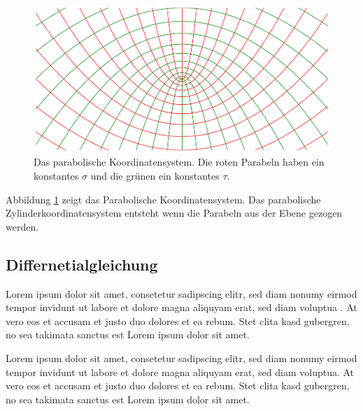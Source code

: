 \begin{figure}
    \centering
    \includegraphics[scale=0.4]{papers/parzyl/img/koordinaten.png}
    \caption{Das parabolische Koordinatensystem. Die roten Parabeln haben ein 
    konstantes $\sigma$ und die grünen ein konstantes $\tau$.}
    \label{fig:cordinates}
\end{figure}

Abbildung \ref{fig:cordinates} zeigt das Parabolische Koordinatensystem.
Das parabolische Zylinderkoordinatensystem entsteht wenn die Parabeln aus der
Ebene gezogen werden. 

\subsection{Differnetialgleichung}
Lorem ipsum dolor sit amet, consetetur sadipscing elitr, sed diam
nonumy eirmod tempor invidunt ut labore et dolore magna aliquyam
erat, sed diam voluptua \cite{parzyl:bibtex}.
At vero eos et accusam et justo duo dolores et ea rebum.
Stet clita kasd gubergren, no sea takimata sanctus est Lorem ipsum
dolor sit amet.

Lorem ipsum dolor sit amet, consetetur sadipscing elitr, sed diam
nonumy eirmod tempor invidunt ut labore et dolore magna aliquyam
erat, sed diam voluptua.
At vero eos et accusam et justo duo dolores et ea rebum.  Stet clita
kasd gubergren, no sea takimata sanctus est Lorem ipsum dolor sit
amet.


